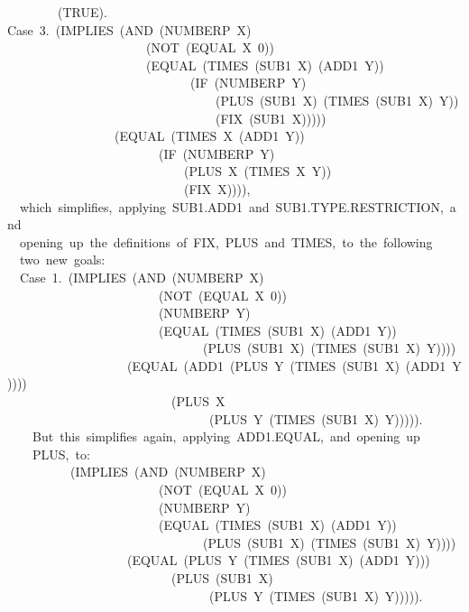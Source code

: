 \documentclass[11pt]{book}
\newenvironment{pubasis}{\begin{flushleft}\ttfamily\small}{\normalsize\rmfamily\end{flushleft}}
\begin{document}
\begin{pubasis}
~~~~~~~~(TRUE).\\

Case~3.~(IMPLIES~(AND~(NUMBERP~X)\\
~~~~~~~~~~~~~~~~~~~~~~(NOT~(EQUAL~X~0))\\
~~~~~~~~~~~~~~~~~~~~~~(EQUAL~(TIMES~(SUB1~X)~(ADD1~Y))\\
~~~~~~~~~~~~~~~~~~~~~~~~~~~~~(IF~(NUMBERP~Y)\\
~~~~~~~~~~~~~~~~~~~~~~~~~~~~~~~~~(PLUS~(SUB1~X)~(TIMES~(SUB1~X)~Y))\\
~~~~~~~~~~~~~~~~~~~~~~~~~~~~~~~~~(FIX~(SUB1~X)))))\\
~~~~~~~~~~~~~~~~~(EQUAL~(TIMES~X~(ADD1~Y))\\
~~~~~~~~~~~~~~~~~~~~~~~~(IF~(NUMBERP~Y)\\
~~~~~~~~~~~~~~~~~~~~~~~~~~~~(PLUS~X~(TIMES~X~Y))\\
~~~~~~~~~~~~~~~~~~~~~~~~~~~~(FIX~X)))),\\

~~which~simplifies,~applying~SUB1.ADD1~and~SUB1.TYPE.RESTRICTION,~and\\
~~opening~up~the~definitions~of~FIX,~PLUS~and~TIMES,~to~the~following\\
~~two~new~goals:\\

~~Case~1.~(IMPLIES~(AND~(NUMBERP~X)\\
~~~~~~~~~~~~~~~~~~~~~~~~(NOT~(EQUAL~X~0))\\
~~~~~~~~~~~~~~~~~~~~~~~~(NUMBERP~Y)\\
~~~~~~~~~~~~~~~~~~~~~~~~(EQUAL~(TIMES~(SUB1~X)~(ADD1~Y))\\
~~~~~~~~~~~~~~~~~~~~~~~~~~~~~~~(PLUS~(SUB1~X)~(TIMES~(SUB1~X)~Y))))\\
~~~~~~~~~~~~~~~~~~~(EQUAL~(ADD1~(PLUS~Y~(TIMES~(SUB1~X)~(ADD1~Y))))\\
~~~~~~~~~~~~~~~~~~~~~~~~~~(PLUS~X\\
~~~~~~~~~~~~~~~~~~~~~~~~~~~~~~~~(PLUS~Y~(TIMES~(SUB1~X)~Y))))).\\

~~~~But~this~simplifies~again,~applying~ADD1.EQUAL,~and~opening~up\\
~~~~PLUS,~to:\\

~~~~~~~~~~(IMPLIES~(AND~(NUMBERP~X)\\
~~~~~~~~~~~~~~~~~~~~~~~~(NOT~(EQUAL~X~0))\\
~~~~~~~~~~~~~~~~~~~~~~~~(NUMBERP~Y)\\
~~~~~~~~~~~~~~~~~~~~~~~~(EQUAL~(TIMES~(SUB1~X)~(ADD1~Y))\\
~~~~~~~~~~~~~~~~~~~~~~~~~~~~~~~(PLUS~(SUB1~X)~(TIMES~(SUB1~X)~Y))))\\
~~~~~~~~~~~~~~~~~~~(EQUAL~(PLUS~Y~(TIMES~(SUB1~X)~(ADD1~Y)))\\
~~~~~~~~~~~~~~~~~~~~~~~~~~(PLUS~(SUB1~X)\\
~~~~~~~~~~~~~~~~~~~~~~~~~~~~~~~~(PLUS~Y~(TIMES~(SUB1~X)~Y))))).\\


\end{pubasis}
\end{document}
